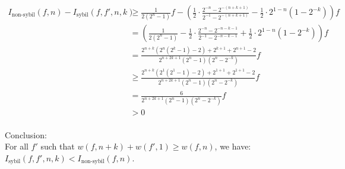 \documentclass[oneside]{article}   	%
\begin{document}
\begin{align*}
I_{\text{non-sybil}}(f,n) - I_{\text{sybil}}(f,f',n,k)  &\geqslant \frac{1}{2\left(2^{n}-1\right)} f-\left(\frac{1}{2} \cdot \frac{2^{-n}-2^{-(n+k+1)}}{2^{-1}-2^{-(n+k+1)}} -\frac{1}{2} \cdot 2^{1-n}\left(1-2^{-k}\right)\right) f \\
                                                    	&= \left(\frac{1}{2\left(2^{n}-1\right)} -\frac{1}{2} \cdot \frac{2^{-n}-2^{-n-k-1}}{2^{-1}-2^{-n-k-1}} +\frac{1}{2} \cdot 2^{1-n}\left(1-2^{-k}\right)\right) f \\
                                                    	&= \frac{2^{n+k}\left(2^{n}\left(2^{k}-1\right) -2\right) +2^{k+1} +2^{n+1} -2}{2^{n+2k+1}\left(2^{n}-1\right)\left(2^{n}-2^{-k}\right)} f \\
                                                    	&\geqslant \frac{2^{n+k}\left(2^{1}\left(2^{1}-1\right)-2\right) +2^{1+1} +2^{1+1} -2}{2^{n+2k+1}\left(2^{n}-1\right)\left(2^{n}-2^{-k}\right)} f \\
                                                    	&= \frac{6}{2^{n+2k+1}\left(2^{n}-1\right)\left(2^{n} -2^{-k}\right)} f \\
                                                    	&>0 \\
\end{align*}


Conclusion:\\
\hangindent=1cm For all $f'$ such that $w(f,n+k)+w(f',1) \geqslant w(f,n)$, we have: $\boxed{I_{\text{sybil}}(f,f',n,k) < I_{\text{non-sybil}}(f,n)}$.
\end{document}
